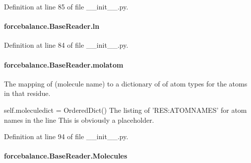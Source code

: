 Definition at line 85 of file \-\_\-\-\_\-init\-\_\-\-\_\-.\-py.

\hypertarget{classforcebalance_1_1BaseReader_a80c8e3bea212600742968aa8669e557b}{
\paragraph[{ln}]{\setlength{\rightskip}{0pt plus 5cm}forcebalance.\-Base\-Reader.\-ln\hspace{0.3cm}{\ttfamily [inherited]}}}\label{classforcebalance_1_1BaseReader_a80c8e3bea212600742968aa8669e557b}


Definition at line 84 of file \-\_\-\-\_\-init\-\_\-\-\_\-.\-py.

\hypertarget{classforcebalance_1_1BaseReader_ab444c213e15929253dd73395ac5f19fc}{
\paragraph[{molatom}]{\setlength{\rightskip}{0pt plus 5cm}forcebalance.\-Base\-Reader.\-molatom\hspace{0.3cm}{\ttfamily [inherited]}}}\label{classforcebalance_1_1BaseReader_ab444c213e15929253dd73395ac5f19fc}


The mapping of (molecule name) to a dictionary of of atom types for the atoms in that residue. 

self.\-moleculedict = Ordered\-Dict() The listing of 'R\-E\-S\-:A\-T\-O\-M\-N\-A\-M\-E\-S' for atom names in the line This is obviously a placeholder. 

Definition at line 94 of file \-\_\-\-\_\-init\-\_\-\-\_\-.\-py.

\hypertarget{classforcebalance_1_1BaseReader_a4369b5fb663a83b11602daa71db6862e}{
\paragraph[{Molecules}]{\setlength{\rightskip}{0pt plus 5cm}forcebalance.\-Base\-Reader.\-Molecules\hspace{0.3cm}{\ttfamily [inherited]}}}\label{classforcebalance_1_1BaseReader_a4369b5fb663a83b11602daa71db6862e}


